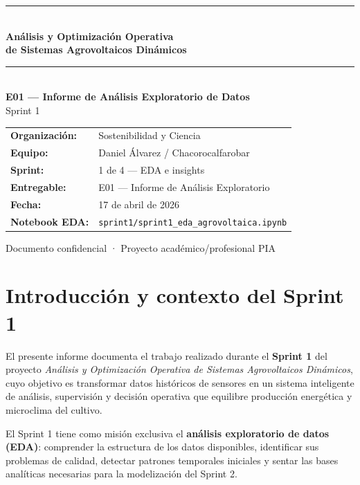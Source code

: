 \documentclass[12pt, a4paper]{article}
\title{}
\date{}
\begin{document}
\begin{titlepage}
\centering
\vspace*{2cm}
{\color{accent}\rule{\linewidth}{2pt}}\\[0.5cm]
{\Large\bfseries Análisis y Optimización Operativa\\[0.3em]
de Sistemas Agrovoltaicos Dinámicos}\\[0.4cm]
{\color{accent}\rule{\linewidth}{1pt}}\\[1.2cm]
{\LARGE\bfseries E01 — Informe de Análisis Exploratorio de Datos}\\[0.3cm]
{\large Sprint 1}\\[2.5cm]
\begin{tabular}{ll}
\textbf{Organización:}   & Sostenibilidad y Ciencia \\[4pt]
\textbf{Equipo:}         & Daniel Álvarez / Chacorocalfarobar \\[4pt]
\textbf{Sprint:}         & 1 de 4 — EDA e insights \\[4pt]
\textbf{Entregable:}     & E01 — Informe de Análisis Exploratorio \\[4pt]
\textbf{Fecha:}          & 17 de abril de 2026 \\[4pt]
\textbf{Notebook EDA:}   & \texttt{sprint1/sprint1\_eda\_agrovoltaica.ipynb} \\
\end{tabular}
\vfill
{\color{muted}\small Documento confidencial · Proyecto académico/profesional PIA}
\end{titlepage}

\tableofcontents
\newpage

\section{Introducción y contexto del Sprint 1}

El presente informe documenta el trabajo realizado durante el \textbf{Sprint 1} del proyecto \emph{Análisis y Optimización Operativa de Sistemas Agrovoltaicos Dinámicos}, cuyo objetivo es transformar datos históricos de sensores en un sistema inteligente de análisis, supervisión y decisión operativa que equilibre producción energética y microclima del cultivo.

El Sprint 1 tiene como misión exclusiva el \textbf{análisis exploratorio de datos (EDA)}: comprender la estructura de los datos disponibles, identificar sus problemas de calidad, detectar patrones temporales iniciales y sentar las bases analíticas necesarias para la modelización del Sprint 2.
\end{document}
